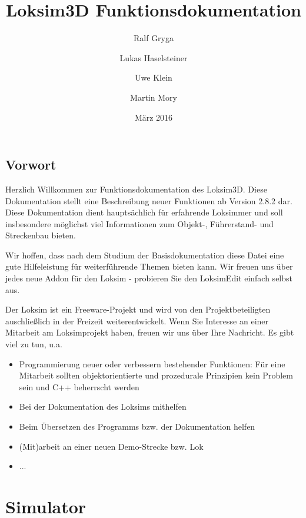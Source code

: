 \documentclass[11pt, a4paper]{refrep}
\begin{document}
\author{Ralf Gryga \and Lukas Haselsteiner \and Uwe Klein \and Martin Mory} 
\title{Loksim3D Funktionsdokumentation} 
\date{März 2016} 

\maketitle


\chapter{Vorwort}
Herzlich Willkommen zur Funktionsdokumentation des Loksim3D. Diese
Dokumentation stellt eine Beschreibung neuer Funktionen ab
Version 2.8.2 dar. Diese Dokumentation dient hauptsächlich für erfahrende Loksimmer 
und soll insbesondere möglichst viel Informationen zum
Objekt-, Führerstand- und Streckenbau bieten.

Wir hoffen, dass nach dem Studium der Basisdokumentation diese Datei
eine gute Hilfeleistung für weiterführende Themen bieten kann. Wir
freuen uns über jedes neue Addon für den Loksim - probieren Sie den
LoksimEdit einfach selbst aus.

Der Loksim ist ein Freeware-Projekt und wird von den Projektbeteiligten
auschließlich in der Freizeit weiterentwickelt. Wenn Sie Interesse an
einer Mitarbeit am Loksimprojekt haben, freuen wir uns über Ihre
Nachricht. Es gibt viel zu tun, u.a.

\begin{itemize}
\item
  Programmierung neuer oder verbessern bestehender Funktionen: 
  Für eine Mitarbeit sollten objektorientierte und prozedurale 
  Prinzipien kein Problem sein und C++ beherrscht werden
\item
  Bei der Dokumentation des Loksims mithelfen
\item
  Beim Übersetzen des Programms bzw. der Dokumentation helfen
\item 
  (Mit)arbeit an einer neuen Demo-Strecke bzw. Lok
\item ...
\end{itemize}

\clearpage



\tableofcontents 

\part{Simulator}
\end{document}
